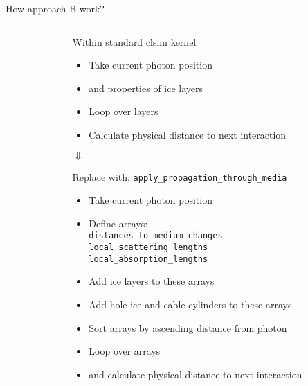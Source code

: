 
\begin{frame}[fragile]{How approach B work?}

  \begin{columns}
    \begin{column}{0.4\textwidth}
    \end{column}
    \begin{column}{0.6\textwidth}

      \begin{block}{Within standard clsim kernel}
        \begin{itemize}
          \setlength\itemsep{-0.5em}
          \item Take current photon position
          \item and properties of ice layers
          \item Loop over layers
          \item Calculate physical distance to next interaction
        \end{itemize}
      \end{block}

      \vspace*{-1em}
      \begin{center} $\Downarrow$ \end{center}
      \vspace*{-1em}

      \begin{block}{Replace with: \texttt{apply\_propagation\_through\_media}}
        \begin{itemize}
          \setlength\itemsep{-0.5em}
          \item Take current photon position
          \item Define arrays:\\
            \texttt{distances\_to\_medium\_changes}\\
            \texttt{local\_scattering\_lengths}\\
            \texttt{local\_absorption\_lengths}
          \item Add ice layers to these arrays
          \item Add hole-ice and cable cylinders to these arrays
          \item Sort arrays by ascending distance from photon
          \item Loop over arrays
          \item and calculate physical distance to next interaction
        \end{itemize}
      \end{block}


    \end{column}
  \end{columns}


\end{frame}
